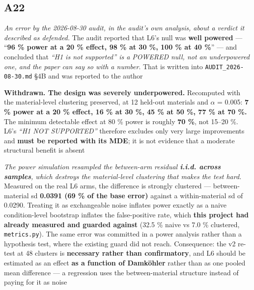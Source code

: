 \documentclass[10pt]{article}
\begin{document}
\subsection*{A22}\label{led:A22}
\begin{description}[leftmargin=0pt,itemsep=1pt]
\item[Claim withdrawn.] \emph{An error by the 2026-08-30 audit, in the audit's own analysis, about a verdict it described as defended.} The audit reported that L6's null was \textbf{well powered} --- ``\textbf{96 \% power at a 20 \% effect, 98 \% at 30 \%, 100 \% at 40 \%}'' --- and concluded that \emph{``H1 is not supported'' is a POWERED null, not an underpowered one, and the paper can say so with a number}. That is written into \texttt{AUDIT\_2026-08-30.md} §4B and was reported to the author
\item[Replaced with.] \textbf{Withdrawn. The design was severely underpowered.} Recomputed with the material-level clustering preserved, at 12 held-out materials and $\alpha$ = 0.005: \textbf{7 \% power at a 20 \% effect, 16 \% at 30 \%, 45 \% at 50 \%, 77 \% at 70 \%.} The minimum detectable effect at 80 \% power is roughly \textbf{70 \%}, not 15--20 \%. L6's \emph{``H1 NOT SUPPORTED''} therefore excludes only very large improvements and \textbf{must be reported with its MDE}; it is not evidence that a moderate structural benefit is absent
\item[Why it was wrong.] \emph{The power simulation resampled the between-arm residual \textbf{i.i.d. across samples}, which destroys the material-level clustering that makes the test hard.} Measured on the real L6 arms, the difference is strongly clustered --- between-material sd \textbf{0.0391 (69 \% of the base error)} against a within-material sd of 0.0290. Treating it as exchangeable noise inflates power exactly as a naive condition-level bootstrap inflates the false-positive rate, which \textbf{this project had already measured and guarded against} (32.5 \% naive vs 7.0 \% clustered, \texttt{metrics.py}). The same error was committed in a power analysis rather than a hypothesis test, where the existing guard did not reach. Consequence: the v2 re-test at 48 clusters is \textbf{necessary rather than confirmatory}, and L6 should be estimated as an effect \textbf{as a function of Damk\"ohler} rather than as one pooled mean difference --- a regression uses the between-material structure instead of paying for it as noise
\end{description}
\end{document}
